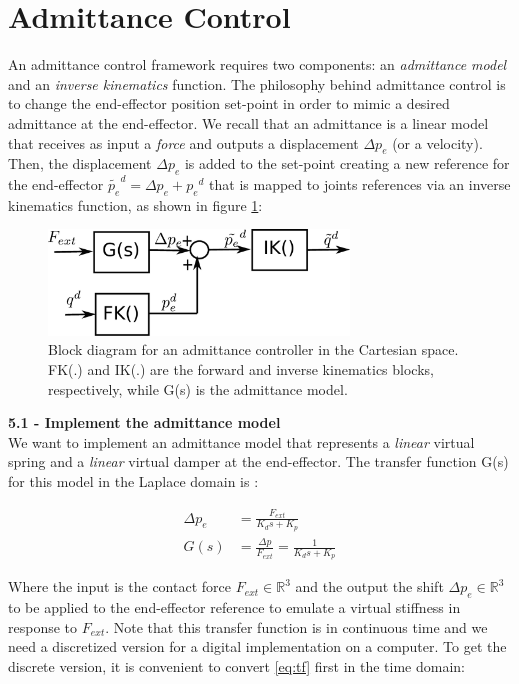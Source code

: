 \documentclass[11pt]{article}
\newcommand{\Rnum}{\mathbb{R}} %
\begin{document}
\section{Admittance Control}
An admittance control framework requires two components: an \textit{admittance model} and an \textit{inverse kinematics} function.
The philosophy behind admittance control is to change the end-effector position set-point in order to mimic a desired admittance at the end-effector. We recall that an admittance is a linear model that receives  as input a \textit{force} and outputs a displacement $\Delta p_e$ (or a velocity). Then, the displacement $\Delta p_e$ is added to the set-point creating a new reference for the end-effector $\tilde{p_e}^d = \Delta p_e + {p_e}^d$  that is mapped to joints references via an inverse kinematics function, as shown in figure \ref{fig:admittance}:

\begin{figure}[bht]
	\centering
	\includegraphics[width=8cm]{pics/admittanceControl.pdf}
	\caption{Block diagram for an admittance controller in the Cartesian space. FK(.) and IK(.) are the forward and inverse kinematics blocks, respectively, while G(s) is the admittance model.}
	\label{fig:admittance}
\end{figure}

\quad

\noindent
\textbf{5.1 - Implement the admittance model }\\
We want to implement an admittance model that represents a \textit{linear} virtual spring and a \textit{linear} virtual damper at the end-effector.
The transfer function G(s) for this model in the Laplace domain is :



\begin{align}
\label{eq:tf}
\Delta p_e &= \frac{ F_{ext} }{K_d s + K_p}\\
G(s)& = \frac{\Delta p}{F_{ext}} = \frac{ 1 }{K_d s + K_p} \nonumber
\end{align}


Where the input is the contact force $F_{ext}\in \Rnum^3$ and the output the shift  $\Delta p_e\in \Rnum^3$ to be applied to the end-effector reference to emulate a virtual stiffness in response to  $F_{ext}$. Note that this transfer function is in continuous time and we need a discretized version for a digital implementation on a computer. To get the discrete version, it is convenient to convert \eqref{eq:tf} first in the time domain:
\end{document}
